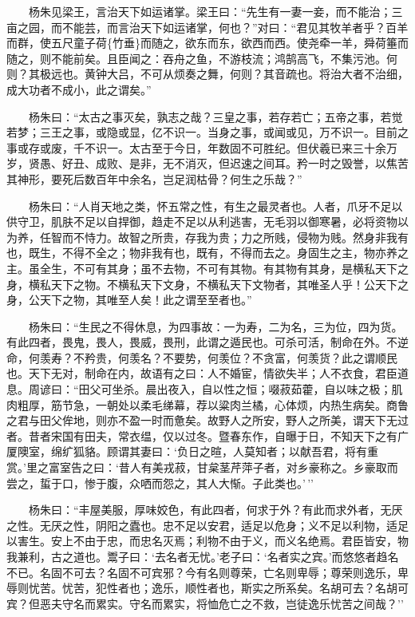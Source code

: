 　　杨朱见梁王，言治天下如运诸掌。梁王曰：``先生有一妻一妾，而不能治；三亩之园，而不能芸，而言治天下如运诸掌，何也？''对曰：``君见其牧羊者乎？百羊而群，使五尺童子荷\{竹垂\}而随之，欲东而东，欲西而西。使尧牵一羊，舜荷箠而随之，则不能前矣。且臣闻之：吞舟之鱼，不游枝流；鸿鹄高飞，不集污池。何则？其极远也。黄钟大吕，不可从烦奏之舞，何则？其音疏也。将治大者不治细，成大功者不成小，此之谓矣。''

　　杨朱曰：``太古之事灭矣，孰志之哉？三皇之事，若存若亡；五帝之事，若觉若梦；三王之事，或隐或显，亿不识一。当身之事，或闻或见，万不识一。目前之事或存或废，千不识一。太古至于今日，年数固不可胜纪。但伏羲已来三十余万岁，贤愚、好丑、成败、是非，无不消灭，但迟速之间耳。矜一时之毁誉，以焦苦其神形，要死后数百年中余名，岂足润枯骨？何生之乐哉？''

　　杨朱曰：``人肖天地之类，怀五常之性，有生之最灵者也。人者，爪牙不足以供守卫，肌肤不足以自捍御，趋走不足以从利逃害，无毛羽以御寒暑，必将资物以为养，任智而不恃力。故智之所贵，存我为贵；力之所贱，侵物为贱。然身非我有也，既生，不得不全之；物非我有也，既有，不得而去之。身固生之主，物亦养之主。虽全生，不可有其身；虽不去物，不可有其物。有其物有其身，是横私天下之身，横私天下之物。不横私天下文身，不横私天下文物者，其唯圣人乎！公天下之身，公天下之物，其唯至人矣！此之谓至至者也。''

　　杨朱曰：``生民之不得休息，为四事故：一为寿，二为名，三为位，四为货。有此四者，畏鬼，畏人，畏威，畏刑，此谓之遁民也。可杀可活，制命在外。不逆命，何羡寿？不矜贵，何羡名？不要势，何羡位？不贪富，何羡货？此之谓顺民也。天下无对，制命在内，故语有之曰：人不婚宦，情欲失半；人不衣食，君臣道息。周谚曰：``田父可坐杀。晨出夜入，自以性之恒；啜菽茹藿，自以味之极；肌肉粗厚，筋节急，一朝处以柔毛绨幕，荐以粱肉兰橘，心体烦，内热生病矣。商鲁之君与田父侔地，则亦不盈一时而惫矣。故野人之所安，野人之所美，谓天下无过者。昔者宋国有田夫，常衣缊，仅以过冬。暨春东作，自曝于日，不知天下之有广厦隩室，绵纩狐貉。顾谓其妻曰：`负日之暄，人莫知者；以献吾君，将有重赏。'里之富室告之曰：`昔人有美戎菽，甘枲茎芹萍子者，对乡豪称之。乡豪取而尝之，蜇于口，惨于腹，众哂而怨之，其人大惭。子此类也。'\,''

　　杨朱曰：``丰屋美服，厚味姣色，有此四者，何求于外？有此而求外者，无厌之性。无厌之性，阴阳之蠹也。忠不足以安君，适足以危身；义不足以利物，适足以害生。安上不由于忠，而忠名灭焉；利物不由于义，而义名绝焉。君臣皆安，物我兼利，古之道也。鬻子曰：`去名者无忧。'老子曰：`名者实之宾。'而悠悠者趋名不已。名固不可去？名固不可宾邪？今有名则尊荣，亡名则卑辱；尊荣则逸乐，卑辱则忧苦。忧苦，犯性者也；逸乐，顺性者也，斯实之所系矣。名胡可去？名胡可宾？但恶夫守名而累实。守名而累实，将恤危亡之不救，岂徒逸乐忧苦之间哉？''

